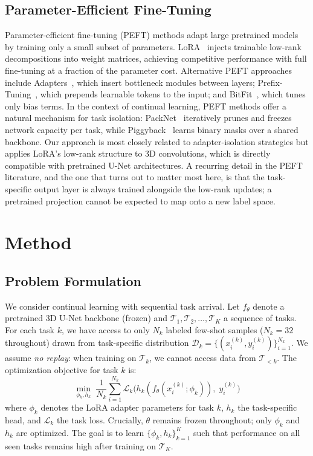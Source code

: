 \documentclass[journal,twoside,web]{ieeecolor}
\begin{document}
\subsection{Parameter-Efficient Fine-Tuning}

Parameter-efficient fine-tuning (PEFT) methods adapt large pretrained models by training only a small subset of parameters. LoRA~\cite{hu2022lora} injects trainable low-rank decompositions into weight matrices, achieving competitive performance with full fine-tuning at a fraction of the parameter cost. Alternative PEFT approaches include Adapters~\cite{houlsby2019}, which insert bottleneck modules between layers; Prefix-Tuning~\cite{prefix_tuning}, which prepends learnable tokens to the input; and BitFit~\cite{bitfit}, which tunes only bias terms. In the context of continual learning, PEFT methods offer a natural mechanism for task isolation: PackNet~\cite{packnet} iteratively prunes and freezes network capacity per task, while Piggyback~\cite{piggyback} learns binary masks over a shared backbone. Our approach is most closely related to adapter-isolation strategies but applies LoRA's low-rank structure to 3D convolutions, which is directly compatible with pretrained U-Net architectures. A recurring detail in the PEFT literature, and the one that turns out to matter most here, is that the task-specific output layer is always trained alongside the low-rank updates; a pretrained projection cannot be expected to map onto a new label space.


\section{Method}
\label{sec:method}

\subsection{Problem Formulation}
\label{sec:problem}

We consider continual learning with sequential task arrival. Let $f_\theta$ denote a pretrained 3D U-Net backbone (frozen) and $\mathcal{T}_1, \mathcal{T}_2, \ldots, \mathcal{T}_K$ a sequence of tasks. For each task $k$, we have access to only $N_k$ labeled few-shot samples ($N_k = 32$ throughout) drawn from task-specific distribution $\mathcal{D}_k = \{(x_i^{(k)}, y_i^{(k)})\}_{i=1}^{N_k}$. We assume \emph{no replay}: when training on $\mathcal{T}_k$, we cannot access data from $\mathcal{T}_{<k}$. The optimization objective for task $k$ is:
\begin{equation}
\min_{\phi_k, h_k} \; \frac{1}{N_k} \sum_{i=1}^{N_k} \mathcal{L}_k \bigl( h_k(f_\theta(x_i^{(k)}; \phi_k)),\; y_i^{(k)} \bigr)
\label{eq:objective}
\end{equation}
where $\phi_k$ denotes the LoRA adapter parameters for task $k$, $h_k$ the task-specific head, and $\mathcal{L}_k$ the task loss. Crucially, $\theta$ remains frozen throughout; only $\phi_k$ and $h_k$ are optimized. The goal is to learn $\{\phi_k, h_k\}_{k=1}^K$ such that performance on all seen tasks remains high after training on $\mathcal{T}_K$.
\end{document}
